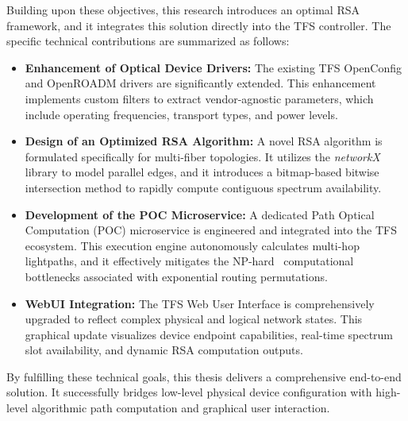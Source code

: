 \documentclass[12pt, a4paper, twoside, openright]{report}
\begin{document}
Building upon these objectives, this research introduces an optimal RSA framework, and it integrates this solution directly into the TFS controller. The specific technical contributions are summarized as follows:
\begin{itemize}
    \item \textbf{Enhancement of Optical Device Drivers:} The existing TFS OpenConfig and OpenROADM drivers are significantly extended. This enhancement implements custom filters to extract vendor-agnostic parameters, which include operating frequencies, transport types, and power levels.
    \item \textbf{Design of an Optimized RSA Algorithm:} A novel RSA algorithm is formulated specifically for multi-fiber topologies. It utilizes the \emph{networkX}~\cite{networkX} library to model parallel edges, and it introduces a bitmap-based bitwise intersection method to rapidly compute contiguous spectrum availability.
    \item \textbf{Development of the POC Microservice:} A dedicated Path Optical Computation (POC) microservice is engineered and integrated into the TFS ecosystem. This execution engine autonomously calculates multi-hop lightpaths, and it effectively mitigates the NP-hard~\cite{wangRSAInfocom} computational bottlenecks associated with exponential routing permutations.
    \item \textbf{WebUI Integration:} The TFS Web User Interface is comprehensively upgraded to reflect complex physical and logical network states. This graphical update visualizes device endpoint capabilities, real-time spectrum slot availability, and dynamic RSA computation outputs.
\end{itemize}

By fulfilling these technical goals, this thesis delivers a comprehensive end-to-end solution. It successfully bridges low-level physical device configuration with high-level algorithmic path computation and graphical user interaction.
\end{document}
